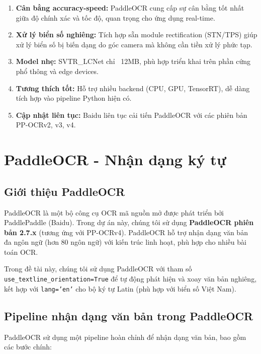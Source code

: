\begin{enumerate}
    \item \textbf{Cân bằng accuracy-speed:} PaddleOCR cung cấp sự cân bằng tốt nhất giữa độ chính xác và tốc độ, quan trọng cho ứng dụng real-time.
    
    \item \textbf{Xử lý biển số nghiêng:} Tích hợp sẵn module rectification (STN/TPS) giúp xử lý biển số bị biến dạng do góc camera mà không cần tiền xử lý phức tạp.
    
    \item \textbf{Model nhẹ:} SVTR\_LCNet chỉ ~12MB, phù hợp triển khai trên phần cứng phổ thông và edge devices.
    
    \item \textbf{Tương thích tốt:} Hỗ trợ nhiều backend (CPU, GPU, TensorRT), dễ dàng tích hợp vào pipeline Python hiện có.
    
    \item \textbf{Cập nhật liên tục:} Baidu liên tục cải tiến PaddleOCR với các phiên bản PP-OCRv2, v3, v4.
\end{enumerate}

\section{PaddleOCR - Nhận dạng ký tự}

\subsection{Giới thiệu PaddleOCR}
PaddleOCR là một bộ công cụ OCR mã nguồn mở được phát triển bởi PaddlePaddle (Baidu). Trong dự án này, chúng tôi sử dụng \textbf{PaddleOCR phiên bản 2.7.x} (tương ứng với PP-OCRv4). PaddleOCR hỗ trợ nhận dạng văn bản đa ngôn ngữ (hơn 80 ngôn ngữ) với kiến trúc linh hoạt, phù hợp cho nhiều bài toán OCR. 

Trong đề tài này, chúng tôi sử dụng PaddleOCR với tham số \texttt{use\_textline\_orientation=True} để tự động phát hiện và xoay văn bản nghiêng, kết hợp với \texttt{lang='en'} cho bộ ký tự Latin (phù hợp với biển số Việt Nam).

\subsection{Pipeline nhận dạng văn bản trong PaddleOCR}

PaddleOCR sử dụng một pipeline hoàn chỉnh để nhận dạng văn bản, bao gồm các bước chính:

